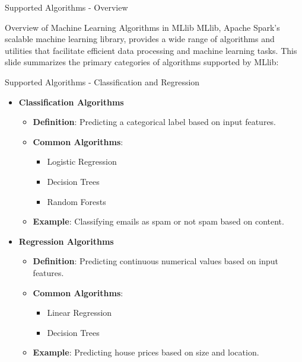 \documentclass[aspectratio=169]{beamer}
\begin{document}
\begin{frame}[fragile]{Supported Algorithms - Overview}
  \begin{block}{Overview of Machine Learning Algorithms in MLlib}
    MLlib, Apache Spark's scalable machine learning library, provides a wide range of algorithms and utilities that facilitate efficient data processing and machine learning tasks. This slide summarizes the primary categories of algorithms supported by MLlib:
  \end{block}
\end{frame}

\begin{frame}[fragile]{Supported Algorithms - Classification and Regression}
  \begin{itemize}
    \item \textbf{Classification Algorithms}
      \begin{itemize}
        \item \textbf{Definition}: Predicting a categorical label based on input features.
        \item \textbf{Common Algorithms}:
          \begin{itemize}
            \item Logistic Regression
            \item Decision Trees
            \item Random Forests
          \end{itemize}
        \item \textbf{Example}: Classifying emails as spam or not spam based on content.
      \end{itemize}
    
    \item \textbf{Regression Algorithms}
      \begin{itemize}
        \item \textbf{Definition}: Predicting continuous numerical values based on input features.
        \item \textbf{Common Algorithms}:
          \begin{itemize}
            \item Linear Regression
            \item Decision Trees
          \end{itemize}
        \item \textbf{Example}: Predicting house prices based on size and location.
      \end{itemize}
  \end{itemize}
\end{frame}
\end{document}
